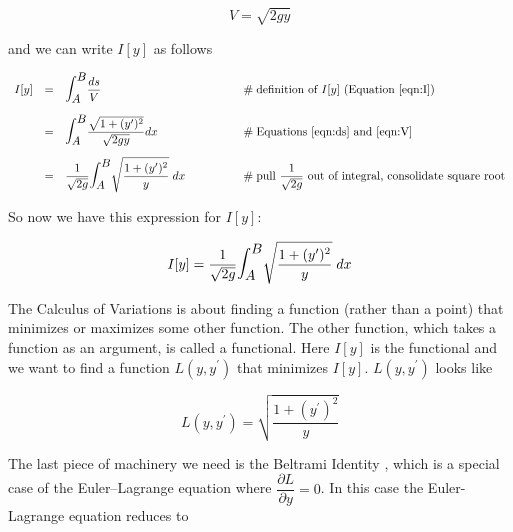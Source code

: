 \documentclass{article}
\theoremstyle{definition}
\begin{document}
\begin{equation}
V = \sqrt{2gy}
\label{eqn:V}
\end{equation}


\bigskip
\noindent
and we can write $I[y]$ as follows

\begin{equation*}
\begin{array}{lllll}
I[y]
&=& {\displaystyle \mathlarger{\mathlarger{\int_A^B}} \dfrac{ds}{V}}
									&\qquad \qquad \mathrel{\#} \text{definition of $I[y]$ (Equation \ref{eqn:I})} \\
[15pt]
&=& {\displaystyle \mathlarger{\mathlarger{\int_A^B}} \dfrac{\sqrt{1 + (y^{\prime})^2}}{\sqrt{2gy}} dx}	
									&\qquad \qquad \mathrel{\#} \text{Equations \ref{eqn:ds} and \ref{eqn:V}} \\
[15pt]

&=& {\displaystyle \dfrac{1}{\sqrt{2g}} \mathlarger{\mathlarger{\int_A^B}} \sqrt{\dfrac{1 + (y^{\prime})^2}{y}} \; dx} 
									&\qquad \qquad \mathrel{\#} \text{pull $\dfrac{1}{\sqrt{2g}}$ out of integral, consolidate square root}
\end{array}
\end{equation*}

\medskip
\bigskip
\noindent
So now we have this expression for $I[y]$:

\medskip
\bigskip
\begin{equation*}
I[y] = \dfrac{1}{\sqrt{2g}} \mathlarger{\mathlarger{\int_A^B}}  \sqrt{\dfrac{1 + (y^{\prime})^2}{y}} \; dx
\end{equation*}

\medskip
\bigskip
\noindent
The Calculus of Variations is about finding a function (rather
than a point) that minimizes or maximizes some other
function. The other function, which takes a function as an
argument, is called a functional. Here $I[y]$ is the functional
and we want to find a function $L(y,y^{\prime})$ that minimizes
$I[y]$. $L(y,y^{\prime})$ looks like

\medskip
\begin{equation}
L(y,y^{\prime}) = \sqrt{\dfrac{1 + (y^{\prime})^2}{y}}
\label{eqn:L}
\end{equation}

\bigskip
\noindent
The last piece of machinery we need is the Beltrami Identity
\cite{wiki:beltrami_identity}, which is a special case of the
Euler–Lagrange equation where $\dfrac{\partial L}{\partial y} =
0$. In this case the Euler-Lagrange equation reduces to
\end{document}
